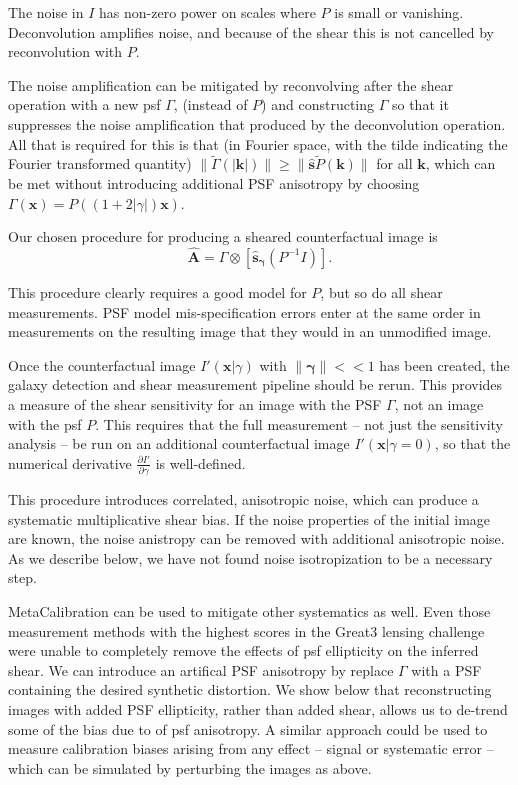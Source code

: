 \documentclass[iop]{emulateapj}
\begin{document}
The noise in $I$ has non-zero power on scales where $P$ is small or
vanishing. Deconvolution amplifies noise, and because of the shear
this is not cancelled by reconvolution with $P$.

The noise amplification can be mitigated by reconvolving after the
shear operation with a new psf $\Gamma$, (instead of $P$) and
constructing $\Gamma$ so that it suppresses the noise amplification
that produced by the deconvolution operation. All that is required for
this is that (in Fourier space, with the tilde indicating the Fourier
transformed quantity)
$\|\tilde{\Gamma}(\mathbf{|k|}) \| \geq \|\hat{\mathbf{s}}
\tilde{P}(\mathbf{k})\|$
for all $\mathbf{k}$, which can be met without introducing additional
PSF anisotropy by choosing
$\Gamma(\mathbf{x}) = P\left((1+2|\gamma|)\mathbf{x}\right)$.

Our chosen procedure for producing a sheared counterfactual image is
\begin{equation}
\hat{\mathbf{A}}  = \Gamma \otimes \left[\hat{\mathbf{s}}_{\boldsymbol \gamma} \left(P^{-1} I \right)\right].
\end{equation}

This procedure clearly requires a good model for $P$, but so do all
shear measurements. PSF model mis-specification errors enter at the
same order in measurements on the resulting image that they would in
an unmodified image.

Once the counterfactual image $I'(\mathbf{x}|\gamma)$ with
$\|{\boldsymbol \gamma}\| << 1$ has been created, the galaxy detection
and shear measurement pipeline should be rerun. This provides a
measure of the shear sensitivity for an image with the PSF $\Gamma$,
not an image with the psf $P$. This requires that the full measurement
-- not just the sensitivity analysis -- be run on an additional
counterfactual image $I'(\mathbf{x}|\gamma=0)$, so that the numerical
derivative $\frac{\partial I'}{\partial \gamma}$ is well-defined.

This procedure introduces correlated, anisotropic noise, which can
produce a systematic multiplicative shear bias. If the noise
properties of the initial image are known, the noise anistropy can be
removed with additional anisotropic noise. As we describe below, we
have not found noise isotropization to be a necessary step.

MetaCalibration can be used to mitigate other systematics as
well. Even those measurement methods with the highest scores in the
Great3 lensing challenge were unable to completely remove the effects
of psf ellipticity on the inferred shear. We can introduce an
artifical PSF anisotropy by replace $\Gamma$ with a PSF containing the
desired synthetic distortion.  We show below that reconstructing
images with added PSF ellipticity, rather than added shear, allows us
to de-trend some of the bias due to of psf anisotropy. A similar approach
could be used to measure calibration biases arising from any effect --
signal or systematic error -- which can be simulated by perturbing the
images as above.
\end{document}
